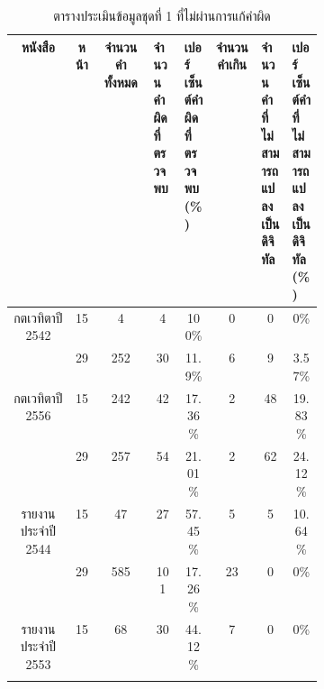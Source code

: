 \begin{table}[H]
    \caption{ตารางประเมินข้อมูลชุดที่ 1 ที่ไม่ผ่านการแก้คำผิด}\label{tbl:correction}
    \begin{tabular}{|c|c|c|p{0.1\linewidth}|p{0.1\linewidth}|c|p{0.1\linewidth}|p{0.1\linewidth}|}
        \hline
        หนังสือ                             & หน้า                       & จำนวนคำทั้งหมด & จำนวนคำผิดที่ตรวจพบ & เปอร์เซ็นต์คำผิดที่ตรวจพบ(\%)    & จำนวนคำเกิน & จำนวนคำที่ไม่สามารถแปลงเป็นดิจิทัล & เปอร์เซ็นต์คำที่ไม่สามารถแปลงเป็นดิจิทัล(\%)    \\ \hline
        \multirow{2}{*}{กตเวทิตาปี 2542}    & 15                           & \multicolumn{1}{c|}{4}         & \multicolumn{1}{c|}{4}          & \multicolumn{1}{c|}{100\%}   & 0      & \multicolumn{1}{c|}{0}               & \multicolumn{1}{c|}{0\%}     \\ \cline{2-8} 
                                            & 29                         & \multicolumn{1}{c|}{252 }      & \multicolumn{1}{c|}{30 }         & \multicolumn{1}{c|}{11.9\% } & \multicolumn{1}{c|}{6 }     & \multicolumn{1}{c|}{9  }             & \multicolumn{1}{c|}{3.57\% } \\ \hline
        \multirow{2}{*}{กตเวทิตาปี 2556}    & 15                           & \multicolumn{1}{c|}{242 }      & \multicolumn{1}{c|}{42 }         & \multicolumn{1}{c|}{17.36\%} & \multicolumn{1}{c|}{2 }     & \multicolumn{1}{c|}{48 }             & \multicolumn{1}{c|}{19.83\%} \\ \cline{2-8} 
                                            & 29                         & \multicolumn{1}{c|}{257 }      & \multicolumn{1}{c|}{54 }         & \multicolumn{1}{c|}{21.01\%} & \multicolumn{1}{c|}{2 }     & \multicolumn{1}{c|}{62 }             & \multicolumn{1}{c|}{24.12\%} \\ \hline
        \multirow{2}{*}{รายงานประจำปี 2544} & 15                           & \multicolumn{1}{c|}{47  }      & \multicolumn{1}{c|}{27 }         & \multicolumn{1}{c|}{57.45\%} & \multicolumn{1}{c|}{5 }     & \multicolumn{1}{c|}{5  }             & \multicolumn{1}{c|}{10.64\%} \\ \cline{2-8} 
                                            & 29                         & \multicolumn{1}{c|}{585 }      & \multicolumn{1}{c|}{101}         & \multicolumn{1}{c|}{17.26\%} & \multicolumn{1}{c|}{23}     & \multicolumn{1}{c|}{0  }             & \multicolumn{1}{c|}{0\%    } \\ \hline
        \multirow{2}{*}{รายงานประจำปี 2553} & 15                           & \multicolumn{1}{c|}{68  }      & \multicolumn{1}{c|}{30 }         & \multicolumn{1}{c|}{44.12\%} & \multicolumn{1}{c|}{7 }     & \multicolumn{1}{c|}{0  }             & \multicolumn{1}{c|}{0\%    } \\ \cline{2-8} 

\end{tabular}
\end{table}
